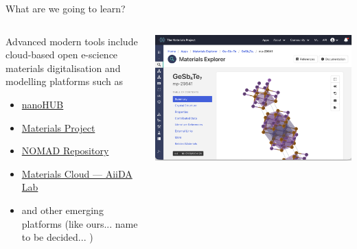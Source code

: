 \documentclass[aspectratio=169]{beamer}
\begin{document}
\begin{frame}{What are we going to learn?}
  \begin{columns}[T] %
    \begin{column}{0.5\textwidth}
     Advanced modern tools include cloud-based open e-science materials digitalisation and modelling platforms such as
      \begin{itemize}
        \item \href{https://nanohub.org}{nanoHUB}
        \item \href{https://materialsproject.org}{Materials Project}
        \item \href{https://www.nomad-coe.eu/the-project/nomad-repository}{NOMAD Repository}
        \item \href{https://www.materialscloud.org/work/aiidalab}{Materials Cloud — AiiDA Lab}
        \item and other emerging platforms (like ours... name to be decided... )
      \end{itemize}
    \end{column}

    \begin{column}{0.5\textwidth}
      \centering
      \includegraphics[width=\linewidth]{media/mp.png}
    \end{column}
  \end{columns}
\end{frame}
\end{document}

